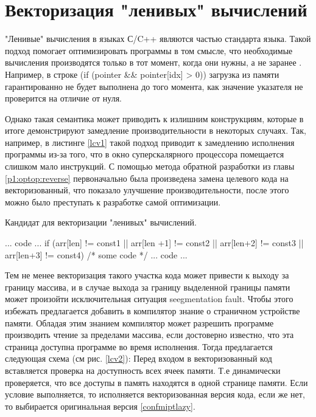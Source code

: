  \section {Векторизация "ленивых"\phantom{ } вычислений}\label{ch2:lcv}
 "Ленивые"\phantom{ } вычисления в языках С/C++ являются частью стандарта языка. Такой подход помогает оптимизировать программы в том смысле, что необходимые вычисления производятся только в тот момент, когда они нужны, а не заранее \cite{cukic2018functional}. Например, в строке (if (pointer \&\& pointer[idx] > 0)) загрузка из памяти гарантированно  не будет выполнена до того момента, как значение указателя не проверится на отличие от нуля. 
 
 Однако такая семантика может приводить к излишним конструкциям, которые в итоге демонстрируют замедление производительности в некоторых случаях.
 Так, например, в листинге \ref{lcv1} такой подход приводит к замедлению исполнения программы из-за того, что в окно суперскалярного процессора помещается слишком мало инструкций. С помощью метода обратной разработки из главы \ref{p1:optop:reverse} первоначально была произведена замена целевого кода на векторизованный, что показало улучшение производительности, после этого можно было преступать к разработке самой оптимизации.
 
 \begin{ListingEnv}[!h]
 	\captiondelim{ } %
 	\caption{Кандидат для векторизации "ленивых"\phantom{ } вычислений.}\label{lcv1}
 	
 	\begin{Verb}
... code ...
if (arr[len] != const1 || arr[len +1] != const2 
	|| arr[len+2] != const3  || arr[len+3] != const4) {
		/* some code */
	}
... code ...
 	\end{Verb}
 \end{ListingEnv}
 
 Тем не менее векторизация такого участка кода может привести к выходу за границу массива, и в случае выхода за границу выделенной границы памяти может произойти исключительная ситуация seegmentation fault. Чтобы этого избежать предлагается добавить в компилятор знание о страничном устройстве памяти. Обладая этим знанием компилятор может разрешить программе производить чтение за пределами массива, если достоверно известно, что эта страница доступна  программе во время исполнения. Тогда предлагается следующая схема (см рис. \ref{lcv2}):
Перед входом в векторизованный код вставляется проверка на доступность всех ячеек памяти. Т.е  динамически проверяется, что все доступы в память находятся в одной странице памяти. Если условие выполняется, то исполняется векторизованная версия кода, если же нет, то выбирается оригинальная версия \ref{confmiptlazy}.
 
